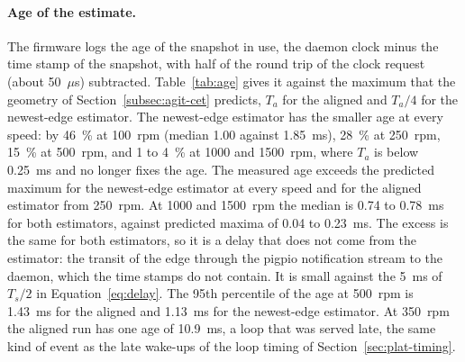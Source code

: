 \begin{table}[htbp]
    \centering
    \caption[Bias of each estimator against the index pulses]{Bias of the mean speed of each estimator against the speed from the index pulses, over the steps above 100~rpm. Tests: A, open loop; Bold, closed loop with the earlier gains; Bimc, closed loop with the gains from the identified plant. ``Steps'' is the number of steps analysed; the bias is in percent of the speed except the last column (rpm).}
    \label{tab:est-acc}
    \small
    \resizebox{\textwidth}{!}{}
\end{table}

\paragraph{Age of the estimate.}
The firmware logs the age of the snapshot in use, the daemon clock minus the time stamp of the snapshot, with half of the round trip of the clock request (about 50~$\mu$s) subtracted. Table~\ref{tab:age} gives it against the maximum that the geometry of Section~\ref{subsec:agit-cet} predicts, $T_a$ for the aligned and $T_a/4$ for the newest-edge estimator. The newest-edge estimator has the smaller age at every speed: by 46~\% at 100~rpm (median 1.00 against 1.85~ms), 28~\% at 250~rpm, 15~\% at 500~rpm, and 1 to 4~\% at 1000 and 1500~rpm, where $T_a$ is below 0.25~ms and no longer fixes the age. The measured age exceeds the predicted maximum for the newest-edge estimator at every speed and for the aligned estimator from 250~rpm. At 1000 and 1500~rpm the median is 0.74 to 0.78~ms for both estimators, against predicted maxima of 0.04 to 0.23~ms. The excess is the same for both estimators, so it is a delay that does not come from the estimator: the transit of the edge through the pigpio notification stream to the daemon, which the time stamps do not contain. It is small against the 5~ms of $T_s/2$ in Equation~\ref{eq:delay}. The 95th percentile of the age at 500~rpm is 1.43~ms for the aligned and 1.13~ms for the newest-edge estimator. At 350~rpm the aligned run has one age of 10.9~ms, a loop that was served late, the same kind of event as the late wake-ups of the loop timing of Section~\ref{sec:plat-timing}.

\begin{table}[htbp]
    \centering
    \caption[Measured age of the speed estimate]{Age of the snapshot in use (microseconds) for the two CET estimators, from the log of the daemon. The prediction is the maximum of the geometric argument of Section~\ref{subsec:agit-cet}, and the aligned period is $T_a = \frac{60\times10^{6}}{256\,n}$~$\mu$s. ``rtt'' is the round trip of the clock request.}
    \label{tab:age}
    \small
    \resizebox{\textwidth}{!}{}
\end{table}

